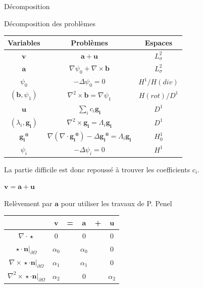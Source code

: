 \documentclass{beamer}
\newcommand{\grad}{{\nabla}}
\newcommand{\laplace}{{\Delta}}
\newcommand{\rot}{{\nabla\times}}
\newcommand{\rott}{{\nabla^2\times}}
\renewcommand{\div}{{\nabla\cdot}}
\newcommand{\restr}{{\big\rvert_{\partial\Omega}}}
\begin{document}
\begin{frame}{Décomposition}
\begin{block}{Décomposition des problèmes}
\begin{center}
\begin{tabular}{|c|c|c|}
\hline
Variables & Problèmes & Espaces\\ \hline
$\mathbf{v}$ & $\mathbf{a} + \mathbf{u}$ & $ L^2_\sigma$\\ \hline
$\mathbf{a}$ & $\grad\psi_0 + \rot \mathbf{b}$ & $ L^2_\sigma$\\ \hline
$\psi_0$ & $-\laplace\psi_0 = 0$ & $ H^1/ H(div)$\\ \hline
$(\mathbf{b},\psi_1)$ & $\rott \mathbf{b}= \grad\psi_1$ & $ H(rot)/ D^1$ \\ \hline
$\mathbf{u}$ & $\sum_i c_i\mathbf{g_i}$ & $ D^1$\\ \hline
$(\lambda_i,\mathbf{g_i})$ & $\rott  \mathbf{g_i} = \Lambda_i \mathbf{g_i}$ & $ D^1$ \\ \hline
$\mathbf{\mathbf{g_i}^0}$ & $\grad(\div \mathbf{\mathbf{g_i}^0}) - \laplace \mathbf{\mathbf{g_i}^0} = \Lambda_i \mathbf{g_i}$ & $ H^1_0$\\ \hline
$\psi_i$ & $-\laplace \psi_i = 0$ & $ H^1$\\ \hline
\end{tabular}
\end{center}
La partie difficile est donc repoussé à trouver les coefficients $c_i$. 
\end{block}
\end{frame}

\begin{frame}{$\mathbf{v}=\mathbf{a}+\mathbf{u}$}
\begin{block}{Relèvement par $\mathbf{a}$ pour utiliser les travaux de P. Penel}
\begin{center}
\begin{tabular}{c|ccccc}
& $\mathbf{v}$ & = & $\mathbf{a}$ & + & $\mathbf{u}$ \\ \hline
$\div\star$ & 0 & & 0 & & 0\\ \hline
$\star\cdot \mathbf{n}\restr$ & $\alpha_0$ & & $\alpha_0$ & & 0\\ \hline
$\rot\star\cdot \mathbf{n}\restr$ & $\alpha_1$ & & $\alpha_1$ & & 0\\\hline
$\rott\star\cdot \mathbf{n}\restr$ & $\alpha_2$ & & 0 & & $\alpha_2$ 
\end{tabular}
\end{center}
\end{block}
\end{frame}
\end{document}

